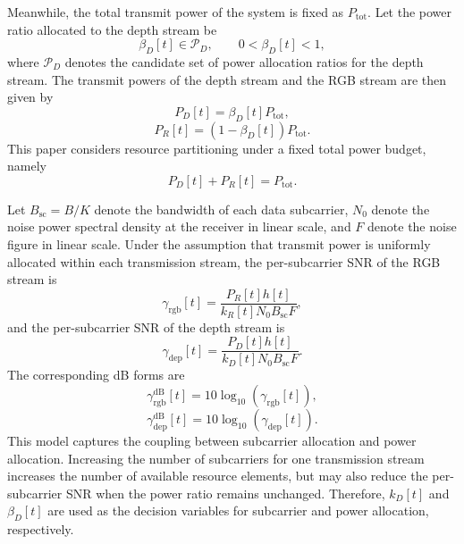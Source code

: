 \documentclass[journal]{IEEEtran}
\begin{document}
Meanwhile, the total transmit power of the system is fixed as $P_{\mathrm{tot}}$. Let the power ratio allocated to the depth stream be
\begin{equation}
\beta_D[t]
\in
\mathcal{P}_D,
\qquad
0<\beta_D[t]<1,
\end{equation}
where $\mathcal{P}_D$ denotes the candidate set of power allocation ratios for the depth stream. The transmit powers of the depth stream and the RGB stream are then given by
\begin{equation}
P_D[t]
=
\beta_D[t]P_{\mathrm{tot}},
\end{equation}
\begin{equation}
P_R[t]
=
\left(1-\beta_D[t]\right)P_{\mathrm{tot}}.
\end{equation}
This paper considers resource partitioning under a fixed total power budget, namely
\begin{equation}
P_D[t]+P_R[t]
=
P_{\mathrm{tot}}.
\end{equation}

Let $B_{\mathrm{sc}}=B/K$ denote the bandwidth of each data subcarrier, $N_0$ denote the noise power spectral density at the receiver in linear scale, and $F$ denote the noise figure in linear scale. Under the assumption that transmit power is uniformly allocated within each transmission stream, the per-subcarrier SNR of the RGB stream is
\begin{equation}
\gamma_{\mathrm{rgb}}[t]
=
\frac{
P_R[t]h[t]
}
{
k_R[t]N_0B_{\mathrm{sc}}F
},
\end{equation}
and the per-subcarrier SNR of the depth stream is
\begin{equation}
\gamma_{\mathrm{dep}}[t]
=
\frac{
P_D[t]h[t]
}
{
k_D[t]N_0B_{\mathrm{sc}}F
}.
\end{equation}
The corresponding dB forms are
\begin{equation}
\gamma_{\mathrm{rgb}}^{\mathrm{dB}}[t]
=
10\log_{10}
\left(
\gamma_{\mathrm{rgb}}[t]
\right),
\end{equation}
\begin{equation}
\gamma_{\mathrm{dep}}^{\mathrm{dB}}[t]
=
10\log_{10}
\left(
\gamma_{\mathrm{dep}}[t]
\right).
\end{equation}
This model captures the coupling between subcarrier allocation and power allocation. Increasing the number of subcarriers for one transmission stream increases the number of available resource elements, but may also reduce the per-subcarrier SNR when the power ratio remains unchanged. Therefore, $k_D[t]$ and $\beta_D[t]$ are used as the decision variables for subcarrier and power allocation, respectively.
\end{document}
